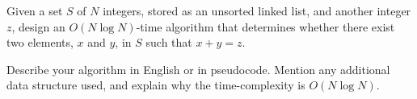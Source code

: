 Given a set $S$ of $N$ integers, stored as an unsorted linked list, and
another integer $z$, design an $O(N \log  N)$-time algorithm that
determines whether there exist two elements, $x$ and $y$, in $S$ such
that $x+y=z$.

Describe your algorithm in English or in pseudocode.  Mention any
additional data structure used, and explain why the time-complexity is
$O(N \log  N)$.
